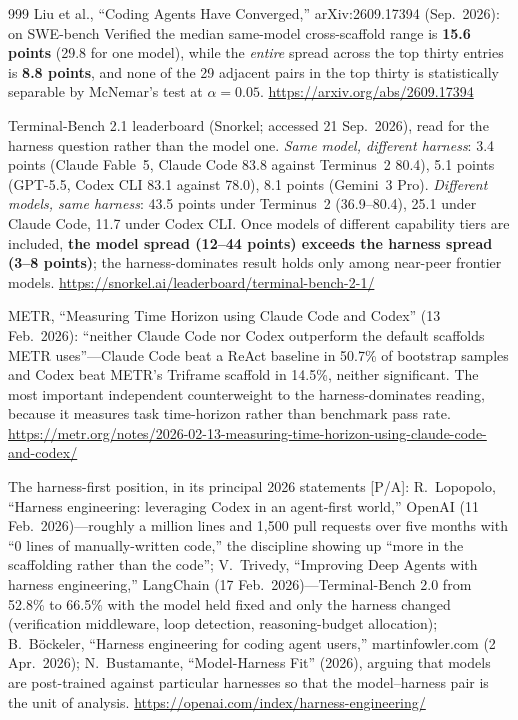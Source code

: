 \begin{thebibliography}{999}
 Liu et al., ``Coding Agents Have Converged,'' arXiv:2609.17394 (Sep.\ 2026): on SWE-bench Verified the median same-model cross-scaffold range is \textbf{15.6 points} (29.8 for one model), while the \emph{entire} spread across the top thirty entries is \textbf{8.8 points}, and none of the 29 adjacent pairs in the top thirty is statistically separable by McNemar's test at $\alpha=0.05$. \url{https://arxiv.org/abs/2609.17394}

 Terminal-Bench 2.1 leaderboard (Snorkel; accessed 21 Sep.\ 2026), read for the harness question rather than the model one. \emph{Same model, different harness}: 3.4 points (Claude Fable~5, Claude Code 83.8 against Terminus~2 80.4), 5.1 points (GPT-5.5, Codex CLI 83.1 against 78.0), 8.1 points (Gemini~3 Pro). \emph{Different models, same harness}: 43.5 points under Terminus~2 (36.9--80.4), 25.1 under Claude Code, 11.7 under Codex CLI. Once models of different capability tiers are included, \textbf{the model spread (12--44 points) exceeds the harness spread (3--8 points)}; the harness-dominates result holds only among near-peer frontier models. \url{https://snorkel.ai/leaderboard/terminal-bench-2-1/}

 METR, ``Measuring Time Horizon using Claude Code and Codex'' (13 Feb.\ 2026): ``neither Claude Code nor Codex outperform the default scaffolds METR uses''---Claude Code beat a ReAct baseline in 50.7\% of bootstrap samples and Codex beat METR's Triframe scaffold in 14.5\%, neither significant. The most important independent counterweight to the harness-dominates reading, because it measures task time-horizon rather than benchmark pass rate. \url{https://metr.org/notes/2026-02-13-measuring-time-horizon-using-claude-code-and-codex/}

 The harness-first position, in its principal 2026 statements [P/A]: R.~Lopopolo, ``Harness engineering: leveraging Codex in an agent-first world,'' OpenAI (11 Feb.\ 2026)---roughly a million lines and 1,500 pull requests over five months with ``0 lines of manually-written code,'' the discipline showing up ``more in the scaffolding rather than the code''; V.~Trivedy, ``Improving Deep Agents with harness engineering,'' LangChain (17 Feb.\ 2026)---Terminal-Bench 2.0 from 52.8\% to 66.5\% with the model held fixed and only the harness changed (verification middleware, loop detection, reasoning-budget allocation); B.~B\"ockeler, ``Harness engineering for coding agent users,'' martinfowler.com (2 Apr.\ 2026); N.~Bustamante, ``Model-Harness Fit'' (2026), arguing that models are post-trained against particular harnesses so that the model--harness pair is the unit of analysis. \url{https://openai.com/index/harness-engineering/}


\end{thebibliography}

